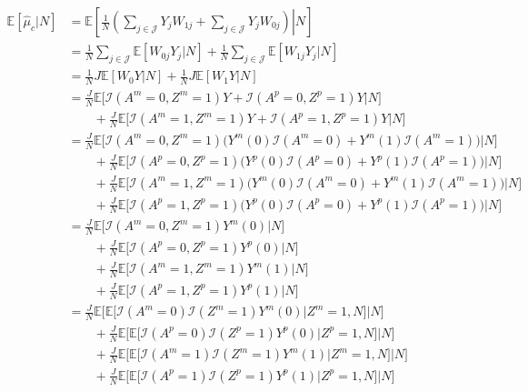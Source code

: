 \documentclass[12pt]{extarticle}
\newcommand{\E}{\mathbb{E}}
\newcommand{\nind}{J}
\newcommand{\indicator}{\mathcal{I}}
\newcommand{\cJ}{\mathcal{J}}
\begin{document}
{\allowdisplaybreaks 
\begin{align}
\E[\hat{\mu}_c | N] & = \E \left[ \left. \frac{1}{N}\left(\sum_{j\in \cJ} Y_jW_{1j} + \sum_{j\in \cJ}Y_jW_{0j}\right) \right| N \right] \nonumber \\
\ & = \frac{1}{N}\sum_{j\in \cJ} \E[W_{0j}Y_j|N]+\frac{1}{N}\sum_{j\in \cJ} \E[W_{1j}Y_j|N] \nonumber \\
\ & = \frac{1}{N} \nind \E[W_0Y|N]+\frac{1}{N} \nind \E[W_1Y|N] \nonumber \\
\ & = \frac{\nind}{N} \E\Big[\indicator(A^m=0,Z^m=1)Y + \indicator(A^p=0,Z^p=1)Y\Big|N\Big] \nonumber \\
\ & \qquad + \frac{\nind}{N} \E\Big[\indicator(A^m=1,Z^m=1)Y + \indicator(A^p=1,Z^p=1)Y\Big|N\Big] \nonumber \\
\ & = \frac{\nind}{N} \E\Big[\indicator(A^m=0,Z^m=1)\big(Y^m(0)\indicator(A^m=0)+Y^m(1)\indicator(A^m=1)\big) \Big|N\Big] \nonumber \\ 
\ & \qquad + \frac{\nind}{N} \E\Big[\indicator(A^p=0,Z^p=1)\big(Y^p(0)\indicator(A^p=0)+Y^p(1)\indicator(A^p=1)\big) \Big|N\Big] \nonumber \\
\ & \qquad + \frac{\nind}{N} \E\Big[\indicator(A^m\!=1,Z^m\!=1)\big(Y^m(0)\indicator(A^m\!=0)+Y^m(1)\indicator(A^m\!=1)\big) \Big|N\Big] \nonumber \\
\ & \qquad + \frac{\nind}{N} \E\Big[\indicator(A^p=1,Z^p=1)\big(Y^p(0)\indicator(A^p=0)+Y^p(1)\indicator(A^p=1)\big) \Big|N\Big] \nonumber \\
\ & = \frac{\nind}{N} \E\Big[\indicator(A^m=0,Z^m=1)Y^m(0) \Big|N\Big] \nonumber \\ 
\ & \qquad + \frac{\nind}{N} \E\Big[\indicator(A^p=0,Z^p=1)Y^p(0) \Big|N\Big] \nonumber \\
\ & \qquad + \frac{\nind}{N} \E\Big[\indicator(A^m=1,Z^m=1)Y^m(1) \Big|N\Big] \nonumber \\
\ & \qquad + \frac{\nind}{N} \E\Big[\indicator(A^p=1,Z^p=1)Y^p(1) \Big|N\Big] \nonumber \\
\ & = \frac{\nind}{N} \E\Big[\E\big[\indicator(A^m=0)\indicator(Z^m=1)Y^m(0)\big|Z^m=1, N\big]\Big|N \Big] \nonumber \\
\ & \qquad + \frac{\nind}{N} \E\Big[\E\big[\indicator(A^p=0)\indicator(Z^p=1)Y^p(0)\big|Z^p=1, N\big]\Big|N \Big] \nonumber \\
\ & \qquad + \frac{\nind}{N} \E\Big[\E\big[\indicator(A^m=1)\indicator(Z^m=1)Y^m(1)\big|Z^m=1, N\big]\Big|N \Big] \nonumber \\
\ & \qquad + \frac{\nind}{N} \E\Big[\E\big[\indicator(A^p=1)\indicator(Z^p=1)Y^p(1)\big|Z^p=1, N\big]\Big|N \Big] \nonumber \\

\end{align}}
\end{document}
